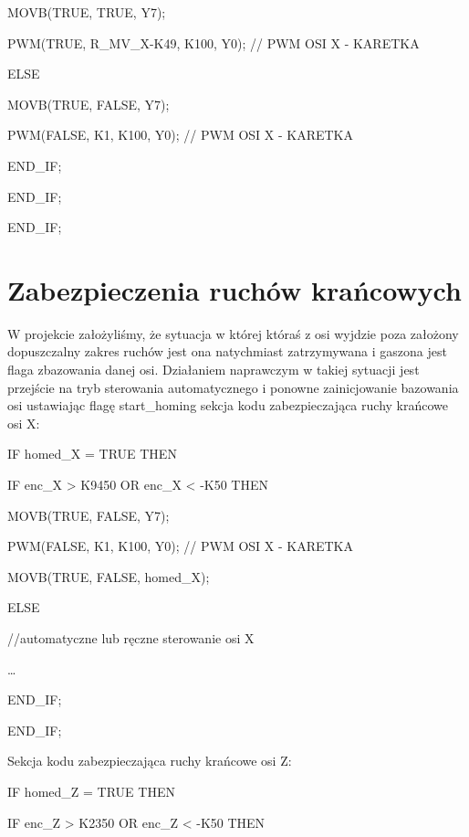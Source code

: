 \documentclass{mwrep}
\begin{document}
\quad \quad \quad \quad MOVB(TRUE, TRUE, Y7);

\quad \quad \quad \quad PWM(TRUE, R\_MV\_X-K49, K100, Y0); // PWM OSI X - KARETKA\quad 

\quad \quad \quad \quad ELSE\quad 

\quad \quad \quad \quad MOVB(TRUE, FALSE, Y7);

\quad \quad \quad \quad PWM(FALSE, K1, K100, Y0); // PWM OSI X - KARETKA\quad 

\quad \quad \quad END\_IF;

\quad \quad END\_IF;

\quad END\_IF;


\section{Zabezpieczenia ruchów krańcowych}
\label{PLC::Krancowki}

W projekcie założyliśmy, że sytuacja w której któraś z osi wyjdzie poza założony dopuszczalny zakres ruchów jest ona natychmiast zatrzymywana i gaszona jest flaga zbazowania danej osi. Działaniem naprawczym w takiej sytuacji jest przejście na tryb sterowania automatycznego i ponowne zainicjowanie bazowania osi ustawiając flagę start\_homing
sekcja kodu zabezpieczająca ruchy krańcowe osi X:

\quad IF homed\_X = TRUE THEN

\quad \quad IF enc\_X > K9450 OR enc\_X < -K50 THEN

\quad \quad \quad MOVB(TRUE, FALSE, Y7);

\quad \quad \quad PWM(FALSE, K1, K100, Y0); // PWM OSI X - KARETKA

\quad \quad \quad MOVB(TRUE, FALSE, homed\_X);

\quad \quad ELSE\quad \quad 

\quad \quad \quad //automatyczne lub ręczne sterowanie osi X

\quad \quad \quad …

\quad \quad END\_IF;

\quad END\_IF;


\vspace{1cm}

Sekcja kodu zabezpieczająca ruchy krańcowe osi Z:

\vspace{0.3cm}

\quad IF homed\_Z = TRUE THEN

\quad \quad IF enc\_Z > K2350 OR enc\_Z < -K50 THEN
\end{document}
